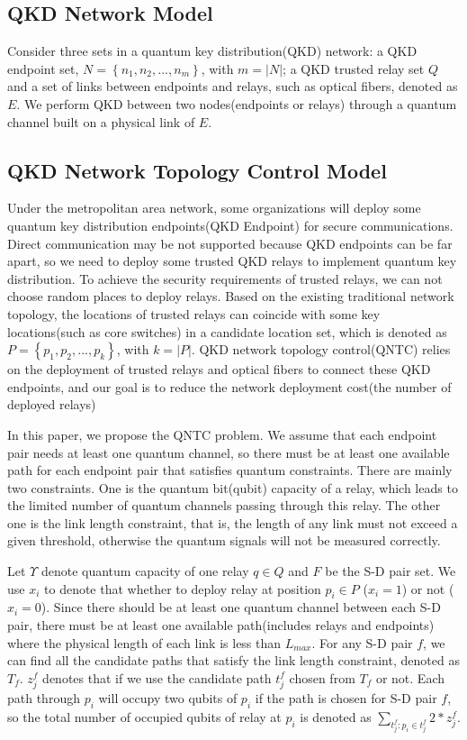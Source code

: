
\subsection{QKD Network Model}
Consider three sets in a quantum key distribution(QKD) network: a QKD endpoint set, $N=\left\{n_1,n_2,...,n_m\right\}$, with $m=\left|N\right|$; a QKD trusted relay set $Q$ and a set of links between endpoints and relays, such as optical fibers, denoted as $E$. We perform QKD between two nodes(endpoints or relays) through a quantum channel built on a physical link of $E$.


\subsection{QKD Network Topology Control Model}
Under the metropolitan area network, some organizations will deploy some quantum key distribution endpoints(QKD Endpoint) for secure communications. Direct communication may be not supported because QKD endpoints can be far apart, so we need to deploy some trusted QKD relays to implement quantum key distribution. To achieve the security requirements of trusted relays, we can not choose random places to deploy relays. Based on the existing traditional network topology, the locations of trusted relays can coincide with some key locations(such as core switches) in a candidate location set, which is denoted as $P=\left\{p_1,p_2,...,p_k\right\}$, with $k=\left|P\right|$. QKD network topology control(QNTC) relies on the deployment of trusted relays and optical fibers to connect these QKD endpoints, and our goal is to reduce the network deployment cost(the number of deployed relays)

In this paper, we propose the QNTC problem. We assume that each endpoint pair needs at least one quantum channel, so there must be at least one available path for each endpoint pair that satisfies quantum constraints. There are mainly two constraints. One is the quantum bit(qubit) capacity of a relay, which leads to the limited number of quantum channels passing through this relay. The other one is the link length constraint, that is, the length of any link must not exceed a given threshold, otherwise the quantum signals will not be measured correctly.

Let $\Upsilon$ denote quantum capacity of one relay $q \in Q$ and $F$ be the S-D pair set. We use $x_i$ to denote that whether to deploy relay at position $p_i \in P$ ($x_i = 1 $) or not ($x_i = 0$). Since there should be at least one quantum channel between each S-D pair, there must be at least one available path(includes relays and endpoints) where the physical length of each link is less than $L_{max}$. For any S-D pair $f$, we can find all the candidate paths that satisfy the link length constraint, denoted as $T_f$. $z_j^f$ denotes that if we use the candidate path $t_j^f$ chosen from $T_f$ or not. Each path through $p_i$ will occupy two qubits of $p_i$ if the path is chosen for S-D pair $f$, so the total number of occupied qubits of relay at $p_i$ is denoted as $\sum_{t^f_j: p_i \in t^f_j}{2*z^f_j}$.

